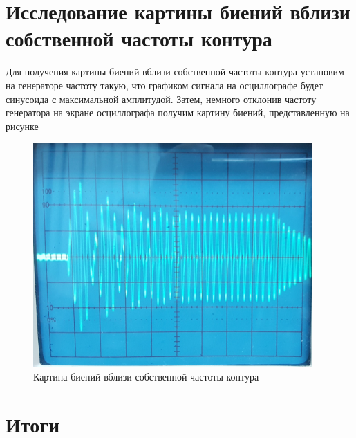 \documentclass[10pt,a4paper]{article}
\begin{document}
	\section{Исследование картины биений вблизи собственной частоты контура}
	
	Для получения картины биений вблизи собственной частоты контура установим на генераторе частоту такую, что графиком сигнала на осциллографе будет синусоида с максимальной амплитудой. Затем, немного отклонив частоту генератора на экране осциллографа получим картину биений, представленную на рисунке 
	
	\begin{figure}[h!]
		\centering
		\includegraphics[width = 0.95\textwidth]{beats}
		\caption{Картина биений вблизи собственной частоты контура}
		\label{fig:beats}	
	\end{figure}
	
	\newpage
	
	\section{Итоги}
	
\end{document}
